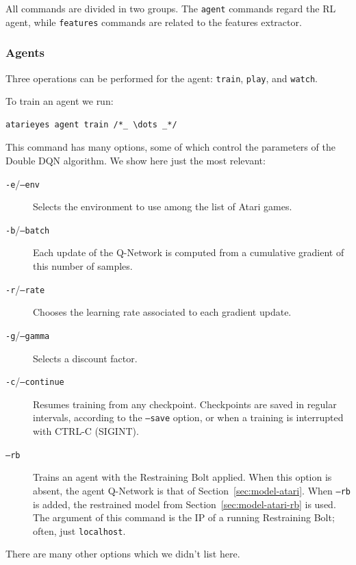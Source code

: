 All commands are divided in two groups. The \texttt{agent} commands regard the
RL agent, while \texttt{features} commands are related to the features
extractor.


\subsubsection*{Agents}

Three operations can be performed for the agent: \texttt{train},
\texttt{play}, and \texttt{watch}.

To train an agent we run:
\begin{lstlisting}[style=bash]
atarieyes agent train /*_ \dots _*/
\end{lstlisting}
This command has many options, some of which control the parameters of the
Double DQN algorithm. We show here just the most relevant:
\begin{description}
	\item [\texttt{-e}/\texttt{--env}] Selects the environment to use among the
		list of Atari games.
	\item [\texttt{-b}/\texttt{--batch}] Each update of the Q-Network is
		computed from a cumulative gradient of this number of samples.
	\item [\texttt{-r}/\texttt{--rate}] Chooses the learning rate associated
		to each gradient update.
	\item [\texttt{-g}/\texttt{--gamma}] Selects a discount factor.
	\item [\texttt{-c}/\texttt{--continue}] Resumes training from any
		checkpoint. Checkpoints are saved in regular intervals, according to the
		\texttt{--save} option, or when a training is interrupted with CTRL-C
		(SIGINT).
	\item [\texttt{--rb}] Trains an agent with the Restraining Bolt applied.
		When this option is absent, the agent Q-Network is that of
		Section~\ref{sec:model-atari}. When \texttt{--rb} is added, the
		restrained model from Section~\ref{sec:model-atari-rb} is used.
		The argument of this command is the IP of a running Restraining Bolt;
		often, just \texttt{localhost}.
\end{description}
There are many other options which we didn't list here.

